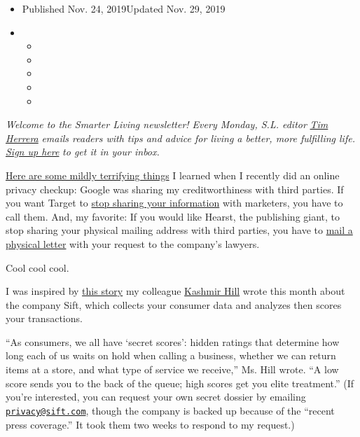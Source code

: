 \begin{itemize}
\item
  Published Nov. 24, 2019Updated Nov. 29, 2019
\item
  \begin{itemize}
  \item
  \item
  \item
  \item
  \item
  \end{itemize}
\end{itemize}

\emph{Welcome to the Smarter Living newsletter! Every Monday, S.L.
editor} \href{https://twitter.com/timherrera}{\emph{Tim Herrera}}
\emph{emails readers with tips and advice for living a better, more
fulfilling life.}
\href{https://www.nytimes.com/newsletters/smarter-living?module=inline}{\emph{Sign
up here}} \emph{to get it in your inbox.}

\href{https://twitter.com/TimHerrera/status/1195067771463360512}{Here
are some mildly terrifying things} I learned when I recently did an
online privacy checkup: Google was sharing my creditworthiness with
third parties. If you want Target to
\href{https://twitter.com/TimHerrera/status/1195075728859156481}{stop
sharing your information} with marketers, you have to call them. And, my
favorite: If you would like Hearst, the publishing giant, to stop
sharing your physical mailing address with third parties, you have to
\href{https://twitter.com/TimHerrera/status/1195070845967851521}{mail a
physical letter} with your request to the company's lawyers.

Cool cool cool.

I was inspired by
\href{https://www.nytimes.com/2019/11/04/business/secret-consumer-score-access.html}{this
story} my colleague
\href{https://www.nytimes.com/by/kashmir-hill}{Kashmir Hill} wrote this
month about the company Sift, which collects your consumer data and
analyzes then scores your transactions.

``As consumers, we all have `secret scores': hidden ratings that
determine how long each of us waits on hold when calling a business,
whether we can return items at a store, and what type of service we
receive,'' Ms. Hill wrote. ``A low score sends you to the back of the
queue; high scores get you elite treatment.'' (If you're interested, you
can request your own secret dossier by emailing
\href{mailto:privacy@sift.com}{\nolinkurl{privacy@sift.com}}, though the
company is backed up because of the ``recent press coverage.'' It took
them two weeks to respond to my request.)


